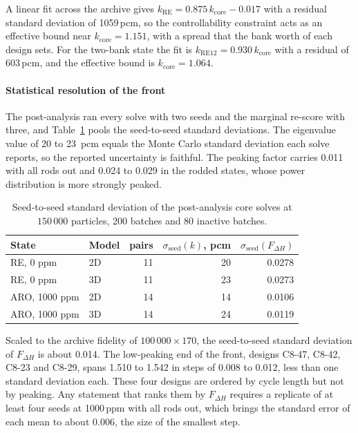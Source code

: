 A linear fit across the archive gives
$k_\mathrm{RE} = 0.875\,k_\mathrm{core} - 0.017$ with a
residual standard deviation of 1059\,pcm, so the controllability constraint acts
as an effective bound near $k_\mathrm{core} = 1.151$, with a spread
that the bank worth of each design sets. For the two-bank state the fit
is $k_\mathrm{RE12} = 0.930\,k_\mathrm{core}$ with a residual of
603\,pcm, and the effective bound is $k_\mathrm{core} = 1.064$.

\paragraph{Statistical resolution of the front}
\label{sec:res-c8-sigma}

The post-analysis ran every solve with two seeds and the marginal
re-score with three, and Table~\ref{tab:c8-post-sigma} pools the
seed-to-seed standard deviations. The eigenvalue value of 20 to
\SI{23}{pcm} equals the Monte Carlo standard deviation each solve
reports, so the reported uncertainty is faithful. The peaking factor
carries 0.011 with all rods out and 0.024 to 0.029 in the rodded
states, whose power distribution is more strongly peaked.

\begin{table}[htbp]
  \centering
  \footnotesize
  \caption{Seed-to-seed standard deviation of the post-analysis core solves at $150\,000$ particles, 200 batches and 80 inactive batches.}
  \label{tab:c8-post-sigma}
  \begin{tabular}{@{}l l r r r@{}}
    \toprule
    State & Model & pairs & $\sigma_\mathrm{seed}(k)$, pcm & $\sigma_\mathrm{seed}(F_{\Delta H})$ \\
    \midrule
    RE, 0 ppm & 2D & 11 & 20 & 0.0278 \\
    RE, 0 ppm & 3D & 11 & 23 & 0.0273 \\
    ARO, 1000 ppm & 2D & 14 & 14 & 0.0106 \\
    ARO, 1000 ppm & 3D & 14 & 24 & 0.0119 \\
    \bottomrule
  \end{tabular}
\end{table}

Scaled to the archive fidelity of $100\,000 \times 170$, the
seed-to-seed standard deviation of $F_{\Delta H}$ is about 0.014. The
low-peaking end of the front, designs C8-47, C8-42, C8-23 and C8-29, spans 1.510 to
1.542 in steps of 0.008 to 0.012, less than one standard deviation
each. These four designs are ordered by cycle length but not by
peaking. Any statement that ranks them by $F_{\Delta H}$ requires a
replicate of at least four seeds at 1000\,ppm with all rods out, which
brings the standard error of each mean to about 0.006, the size of the
smallest step.


